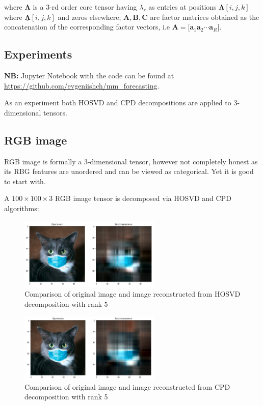 \documentclass[../../main.tex]{subfiles}
\begin{document}
where $\mathbf{\underline{\Lambda}}$ is a 3-rd order core tensor having $\lambda_r$ as entries at positions $\mathbf{\underline{\Lambda}}[i, j, k]$ where $\mathbf{\underline{\Lambda}}[i, j, k]$ and zeros elsewhere; $\mathbf{A}, \mathbf{B}, \mathbf{C}$ are factor matrices obtained as the concatenation of the corresponding factor vectors, i.e $\mathbf{A} = \Big[    \mathbf{a}_1 \mathbf{a}_2  \cdots \mathbf{a}_R   \Big]$.

\subsection{Experiments}

\textbf{NB:} Jupyter Notebook with the code can be found at \url{https://github.com/evgeniishch/mm_forecasting}.

As an experiment both HOSVD and CPD decompositions are applied to 3-dimensional tensors. 

\subsection{RGB image}

RGB image is formally a 3-dimensional tensor, however not completely honest as its RBG features are unordered and can be viewed as categorical. Yet it is good to start with.

A $100 \times 100 \times 3$ RGB image tensor is decomposed via HOSVD and CPD algorithms:

\begin{figure}[h!]
\centering
\includegraphics[width=0.6\textwidth]{figures/tucker_img}
\caption{Comparison of original image and image reconstructed from HOSVD decomposition with rank 5}
\label{fig:Lab1:3}
\end{figure}

\begin{figure}[h!]
\centering
\includegraphics[width=0.6\textwidth]{figures/cpd_img}
\caption{Comparison of original image and image reconstructed from CPD decomposition with rank 5}
\label{fig:Lab1:4}
\end{figure}
\end{document}
